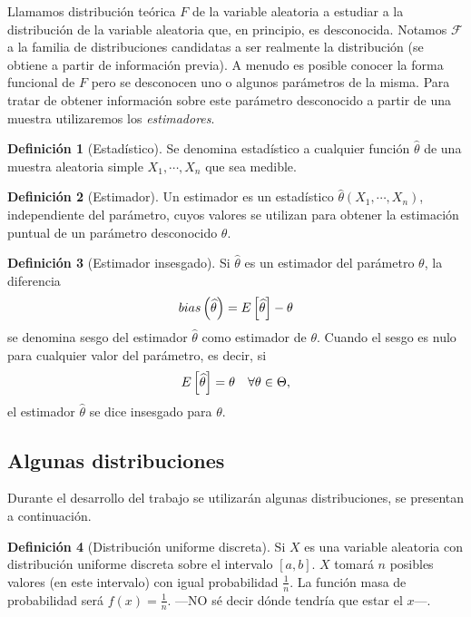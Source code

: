 \documentclass[10pt,a4paper]{article} %
\let\mathbb\relax
\theoremstyle{definition}
\newtheorem{definition}{Definición}[section]
\begin{document}
Llamamos distribución teórica $F$ de la variable aleatoria a estudiar a la distribución de la variable aleatoria que, en principio, es desconocida. Notamos $\mathcal{F}$ a la familia de distribuciones candidatas a ser realmente la distribución (se obtiene a partir de información previa). A menudo es posible conocer la forma funcional de $F$ pero se desconocen uno o algunos parámetros de la misma. Para tratar de obtener información sobre este parámetro desconocido a partir de una muestra utilizaremos los \textit{estimadores}.

\begin{definition}[Estadístico]
  Se denomina estadístico a cualquier función $\widehat{\theta}$ de una muestra aleatoria simple $X_1,\cdots,X_n$  que sea medible.
\end{definition}

\begin{definition}[Estimador]
Un estimador es un estadístico $\widehat{\theta}(X_1,\cdots,X_n)$, independiente del parámetro, cuyos valores se utilizan para obtener la estimación puntual de un parámetro desconocido $\theta$.
\end{definition}

\begin{definition}[Estimador insesgado]
  Si $\widehat{\theta}$ es un estimador del parámetro $\theta$, la diferencia \[
bias\left( \widehat{\theta}\right) = \mathbb{E}\left [\widehat{\theta} \right ] - \theta
\]
se denomina sesgo del estimador $\widehat{\theta}$ como estimador de $\theta$. Cuando el sesgo es nulo para cualquier valor del parámetro, es decir, si\[
\mathbb{E} \left [\widehat{\theta}\right] = \theta\quad \forall\theta \in\Theta,
\]
el estimador $\widehat{\theta}$ se dice insesgado para $\theta$.
\end{definition}


\subsection{Algunas distribuciones}

Durante el desarrollo del trabajo se utilizarán algunas distribuciones, se presentan a continuación.

\begin{definition}[Distribución uniforme discreta]
Si $X$ es una variable aleatoria con distribución uniforme discreta sobre el intervalo $[a,b]$. $X$ tomará $n$ posibles valores (en este intervalo) con igual probabilidad $\frac{1}{n}$. La función masa de probabilidad será $f(x) = \frac{1}{n}$. ---NO sé decir dónde tendría que estar el $x$---.
\end{definition}
\end{document}
